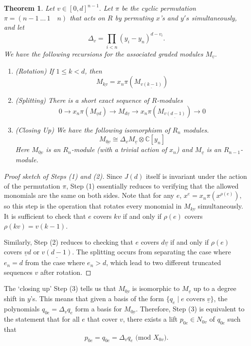 \documentclass[submission]{FPSAC2027}
\newcommand{\C}{\mathbb{C}}
\newcommand{\uv}{\underline{v}}
\newcommand{\uov}{\underline{0v}}
\newtheorem{thm}{Theorem}
\begin{document}
\begin{thm}
    \label{thm: filtration recursions}
    Let $v \in [0,d]^{n-1}.$ Let $\pi$ be the cyclic permutation $\pi = (n-1 \ \dots \,  1 \quad n)$ that acts on $R$ by permuting $x$'s and $y's$ simultaneously, and let 
    $$\Delta_v = \prod_{i < n} (y_i - y_n)^{d-v_i}.$$
    We have the following recursions for the associated graded modules $M_{\uv}$.
    \begin{enumerate}
        \item (Rotation) If $1 \leq k < d$, then
        $$M_{\underline{kv}} = x_n \pi(M_{\underline{v(k-1)}})$$
        \item (Splitting) There is a short exact sequence of $R$-modules
        $$0 \rightarrow x_n\pi\left( M_{\uv d}\right) \rightarrow M_{d \uv} \rightarrow x_n \pi \left( M_{\underline{v(d-1)}}\right) \rightarrow 0$$
        \item (Closing Up) We have the following isomorphism of $R_n$ modules.
    \begin{equation}
        M_{\uov} \cong \Delta_v M_{\uv} \otimes \C[y_n]
    \end{equation}
    Here $M_{\uov}$ is an $R_n$-module (with a trivial action of $x_n$) and $M_{\uv}$ is an $R_{n-1}$-module.
    \end{enumerate}
\end{thm}
\begin{proof}[Proof sketch of Steps (1) and (2)]
    Since $J(d)$ itself is invariant under the action of the permutation $\pi$, Step (1) essentially reduces to verifying that the allowed monomials are the same on both sides. Note that for any $e$, $x^e = x_n \pi (x^{\rho(e)}),$ so this step is the operation that rotates every monomial in $M_{\underline{kv}}$ simultaneously. It is sufficient to check that $e$ covers $kv$ if and only if $\rho(e)$ covers $\rho(kv) = v(k-1)$.

    Similarly, Step (2) reduces to checking that $e$ covers $d\underline{v}$ if and only if $\rho(e)$ covers $\underline{v}d$ or $\underline{v(d-1)}$. The splitting occurs from separating the case where $e_n = d$ from the case where $e_n > d$, which lead to two different truncated sequences $v$ after rotation.
\end{proof}

The `closing up' Step (3) tells us that $M_{\uov}$ is isomorphic to $M_{\uv}$ up to a degree shift in $y$'s. This means that given a basis of the form $\{q_{e} \mid e \textrm{ covers } \uv \}$, the polynomials $q_{0e} = \Delta_v q_e$ form a basis for $M_{\uov}$. Therefore, Step (3) is equivalent to the statement that for all $e$ that cover $v$, there exists a lift $p_{0e} \in N_{0v}$ of $q_{0e}$ such that 
$$p_{0e} = q_{0e} = \Delta_v q_e \textrm{ (mod }X_{0v}).$$
\end{document}
